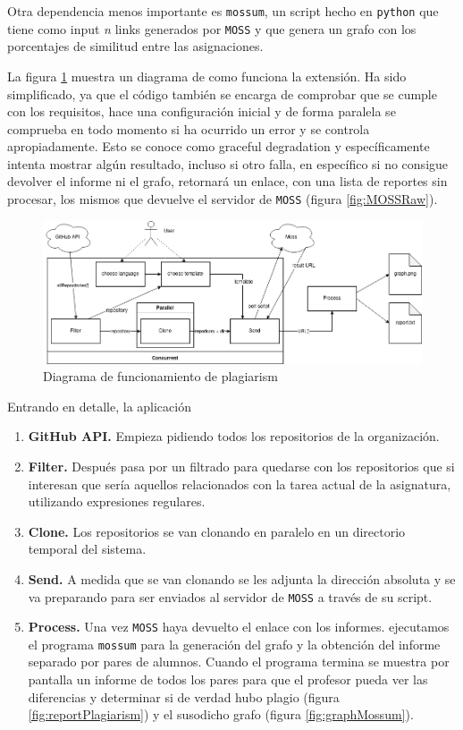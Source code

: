 Otra dependencia menos importante es \verb|mossum|\cite{mossum}, un script hecho en \verb|python| que tiene como input \emph{n} links generados por \verb|MOSS| y que genera un grafo con los porcentajes de similitud entre las asignaciones.

La figura \ref{fig:plagiarism} muestra un diagrama de como funciona la extensión. Ha sido simplificado, ya que el código también se encarga de comprobar que se cumple con los requisitos, hace una configuración inicial y de forma paralela se comprueba en todo momento si ha ocurrido un error y se controla apropiadamente. Esto se conoce como \gls{graceful degradation} y específicamente intenta mostrar algún resultado, incluso si otro falla, en específico si no consigue devolver el informe ni el grafo, retornará un enlace, con una lista de reportes sin procesar, los mismos que devuelve el servidor de \verb|MOSS| (figura \ref{fig:MOSSRaw}).

\begin{figure}[H]
    \centering
    \includegraphics[width=\linewidth]{images/plagiarism.png}
    \caption{Diagrama de funcionamiento de plagiarism}
    \label{fig:plagiarism}
\end{figure}

Entrando en detalle, la aplicación 
\begin{enumerate}
    \item \textbf{GitHub API.} Empieza pidiendo todos los repositorios de la organización.
    \item \textbf{Filter.} Después pasa por un filtrado para quedarse con los repositorios que si interesan que sería aquellos relacionados con la tarea actual de la asignatura, utilizando expresiones regulares.
    \item \textbf{Clone.} Los repositorios se van clonando en paralelo en un directorio temporal del sistema.
    \item \textbf{Send.} A medida que se van clonando se les adjunta la dirección absoluta y se va preparando para ser enviados al servidor de \verb|MOSS| a través de su script.
    \item \textbf{Process.} Una vez \verb|MOSS| haya devuelto el enlace con los informes. ejecutamos el programa \verb|mossum| para la generación del grafo y la obtención del informe separado por pares de alumnos. Cuando el programa termina se muestra por pantalla un informe de todos los pares para que el profesor pueda ver las diferencias y determinar si de verdad hubo plagio (figura \ref{fig:reportPlagiarism}) y el susodicho grafo (figura \ref{fig:graphMossum}).
\end{enumerate}

